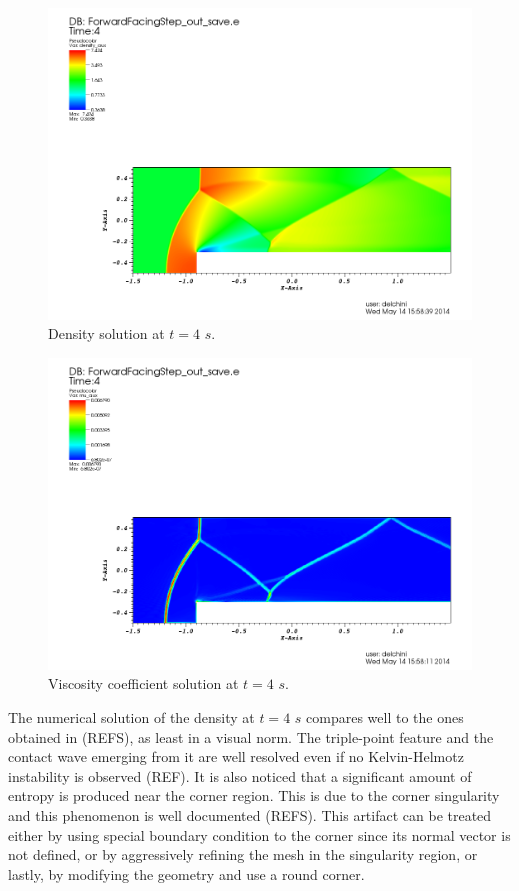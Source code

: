 \begin{figure}[H]
\centering
\includegraphics[scale=.50]{figures/FFSDensityEqualTo4.png}
\caption{Density solution at $t=4$ $s$.}
\label{fig:2d_ffs_rho_4}
\end{figure}
%
\begin{figure}[H]
\centering
\includegraphics[scale=.50]{figures/FFSViscEqualTo4.png}
\caption{Viscosity coefficient solution at $t=4$ $s$.}
\label{fig:2d_ffs_visc_4}
\end{figure}
The numerical solution of the density at $t=4$ $s$ compares well to the ones obtained in (REFS), as least in a visual norm. The triple-point feature and the contact wave emerging from it are well resolved even if no Kelvin-Helmotz instability is observed (REF). It is also noticed that a significant amount of entropy is produced near the corner region. This is due to the corner singularity and this phenomenon is well documented (REFS). This artifact can be treated either by using special boundary condition to the corner since its normal vector is not defined, or by aggressively refining the mesh in the singularity region, or lastly, by modifying the geometry and use a round corner. 
